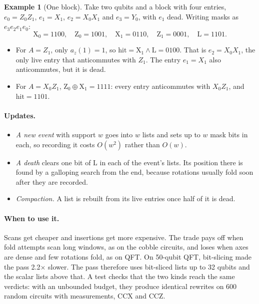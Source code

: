 \documentclass[11pt]{article}
\theoremstyle{definition}
\newtheorem{example}[theorem]{Example}
\theoremstyle{remark}
\begin{document}
\begin{example}[One block]
Take two qubits and a block with four entries,
$e_0 = Z_0Z_1$, $e_1 = X_1$, $e_2 = X_0X_1$ and $e_3 = Y_0$, with $e_1$ dead. Writing
masks as $e_3e_2e_1e_0$:
\[
  \mathrm{X}_0 = 1100,\quad \mathrm{Z}_0 = 1001,\quad \mathrm{X}_1 = 0110,\quad
  \mathrm{Z}_1 = 0001,\quad \mathrm{L} = 1101 .
\]
\begin{itemize}[nosep]
  \item For $A = Z_1$, only $a_z(1) = 1$, so $\mathrm{hit} = \mathrm{X}_1 \wedge \mathrm{L}
  = 0100$. That is $e_2 = X_0X_1$, the only live entry that anticommutes with $Z_1$. The
  entry $e_1 = X_1$ also anticommutes, but it is dead.
  \item For $A = X_0Z_1$, $\mathrm{Z}_0 \oplus \mathrm{X}_1 = 1111$: every entry
  anticommutes with $X_0Z_1$, and $\mathrm{hit} = 1101$.
\end{itemize}
\end{example}

\paragraph{Updates.}
\begin{itemize}[nosep]
  \item \emph{A new event} with support $w$ goes into $w$ lists and sets up to $w$ mask bits
  in each, so recording it costs $O(w^2)$ rather than $O(w)$.
  \item \emph{A death} clears one bit of $\mathrm{L}$ in each of the event's lists. Its
  position there is found by a galloping search from the end, because rotations usually
  fold soon after they are recorded.
  \item \emph{Compaction.} A list is rebuilt from its live entries once half of it is dead.
\end{itemize}

\paragraph{When to use it.}
Scans get cheaper and insertions get more expensive. The trade pays off when fold attempts
scan long windows, as on the cobble circuits, and loses when axes are dense and few
rotations fold, as on QFT. On 50-qubit QFT, bit-slicing made the pass 2.2$\times$ slower.
The pass therefore uses bit-sliced lists up to 32 qubits and the scalar lists above that.
A test checks that the two kinds reach the same verdicts: with an unbounded budget, they
produce identical rewrites on 600 random circuits with measurements, CCX and CCZ.
\end{document}
